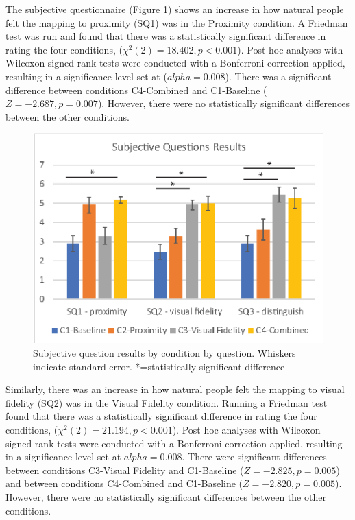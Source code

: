 The subjective questionnaire (Figure \ref{fig:contacts:sq2}) shows an increase in how natural people felt the mapping to proximity (SQ1) was in the Proximity condition. A Friedman test was run and found that there was a statistically significant difference in rating the four conditions, ($\chi^2(2)=18.402,p<0.001$). Post hoc analyses with Wilcoxon signed-rank tests were conducted with a Bonferroni correction applied, resulting in a significance level set at ($alpha=0.008$). There was a significant difference between conditions C4-Combined and C1-Baseline ($Z=-2.687, p=0.007$). However, there were no statistically significant differences between the other conditions.

\begin{figure}[ht]
    \centering
    \includegraphics[width=0.8\linewidth]{images/41-visualising-mgia17/analysis-images-05.eps}
    \caption{Subjective question results by condition by question. Whiskers indicate standard error. *=statistically significant difference}
    \label{fig:contacts:sq2}
\end{figure}

Similarly, there was an increase in how natural people felt the mapping to visual fidelity (SQ2) was in the Visual Fidelity condition. Running a Friedman test found that there was a statistically significant difference in rating the four conditions, ($\chi^2(2)=21.194,p<0.001$). Post hoc analyses with Wilcoxon signed-rank tests were conducted with a Bonferroni correction applied, resulting in a significance level set at $alpha=0.008$. There were significant differences between conditions C3-Visual Fidelity and C1-Baseline ($Z=-2.825, p=0.005$) and between conditions C4-Combined and C1-Baseline ($Z=-2.820, p=0.005$). However, there were no statistically significant differences between the other conditions.

